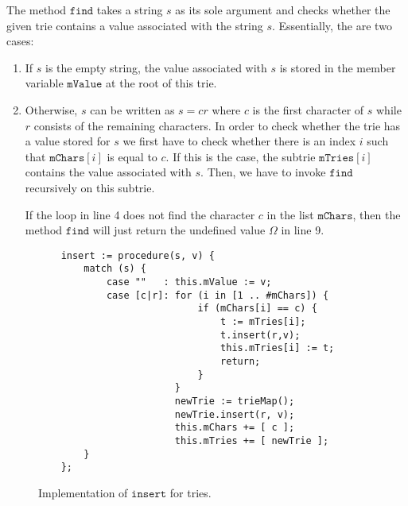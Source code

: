 The method $\texttt{find}$ takes a string $s$ as its sole argument and checks whether the given trie
contains a value associated with the string $s$.  Essentially, the are two cases:
\begin{enumerate}
\item If $s$ is the empty string, the value associated with $s$ is stored in the member variable
      $\texttt{mValue}$ at the root of this trie.
\item Otherwise, $s$ can be written as $s = cr$ where $c$ is the first character of $s$ while $r$
      consists of the remaining characters.  In order to check whether the trie has a value stored
      for $s$ we first have to check whether there is an index $i$ such that $\texttt{mChars}[i]$ is
      equal to $c$.  If this is the case, the subtrie $\texttt{mTries}[i]$ contains the value
      associated with $s$.  Then, we have to invoke $\texttt{find}$ recursively on this subtrie.

      If the loop in line 4 does not find the character $c$ in the list $\texttt{mChars}$, then the method
      $\texttt{find}$ will just return the undefined value $\Omega$ in line 9.
\end{enumerate}


\begin{figure}[!ht]
\centering
\begin{verbatim}
    insert := procedure(s, v) {
        match (s) {
            case ""   : this.mValue := v;
            case [c|r]: for (i in [1 .. #mChars]) {
                            if (mChars[i] == c) {
                                t := mTries[i];
                                t.insert(r,v);
                                this.mTries[i] := t;
                                return;
                            }
                        }
                        newTrie := trieMap();
                        newTrie.insert(r, v);
                        this.mChars += [ c ]; 
                        this.mTries += [ newTrie ];
        } 
    };
\end{verbatim}
\vspace*{-0.3cm}
\caption{Implementation of $\texttt{insert}$ for tries.}
\label{fig:trie.ipython-insert}
\end{figure}


